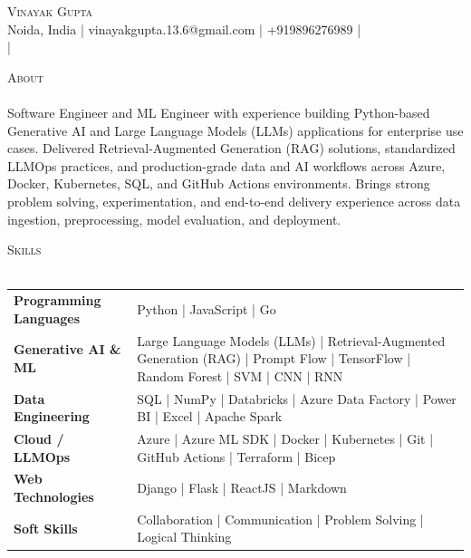 \documentclass[a4paper]{article}
\newcommand{\lineunder} {
    \vspace*{-8pt} \\
    \hspace*{-18pt} \hrulefill \\
}
\newcommand{\header} [1] {
    {\hspace*{-18pt}\vspace*{6pt} \textsc{#1}}
    \vspace*{-6pt} \lineunder
}
\begin{document}
\vspace*{-40pt}

\vspace*{-10pt}
\begin{center}
	{\Huge \scshape {Vinayak Gupta}}\\
	Noida, India | vinayakgupta.13.6@gmail.com | +919896276989 | \\ \href{https://www.linkedin.com/in/vinayak-gupta30/}{\faLinkedin} | \href{https://github.com/ctrl-infinity}{\faGithub}\\
\end{center}

\header{About}
\vspace{1mm}
Software Engineer and ML Engineer with experience building Python-based Generative AI and Large Language Models (LLMs) applications for enterprise use cases. Delivered Retrieval-Augmented Generation (RAG) solutions, standardized LLMOps practices, and production-grade data and AI workflows across Azure, Docker, Kubernetes, SQL, and GitHub Actions environments. Brings strong problem solving, experimentation, and end-to-end delivery experience across data ingestion, preprocessing, model evaluation, and deployment.
\vspace{2mm}

\header{Skills}
\begin{tabular}{ l l }
    \textbf{Programming Languages} & Python | JavaScript | Go \\
    \textbf{Generative AI \& ML} & Large Language Models (LLMs) | Retrieval-Augmented Generation (RAG) | Prompt Flow | TensorFlow | Random Forest | SVM | CNN | RNN \\
    \textbf{Data Engineering} & SQL | NumPy | Databricks | Azure Data Factory | Power BI | Excel | Apache Spark \\
    \textbf{Cloud / LLMOps} & Azure | Azure ML SDK | Docker | Kubernetes | Git | GitHub Actions | Terraform | Bicep \\
    \textbf{Web Technologies} & Django | Flask | ReactJS | Markdown \\
    \textbf{Soft Skills} & Collaboration | Communication | Problem Solving | Logical Thinking \\
\end{tabular}
\vspace{2mm}
\end{document}
